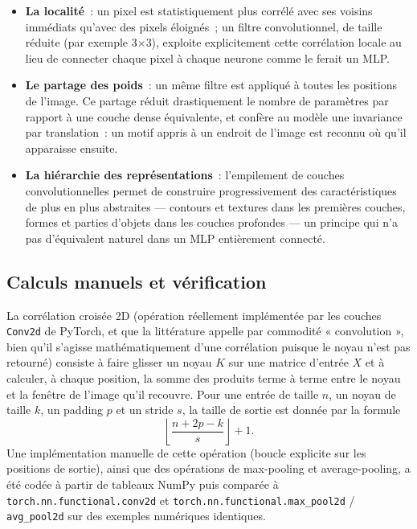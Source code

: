 \documentclass[11pt,a4paper]{article}
\begin{document}
\begin{itemize}[leftmargin=1.2cm]
\item \textbf{La localité}~: un pixel est statistiquement plus corrélé avec ses voisins immédiats qu'avec des pixels éloignés~; un filtre convolutionnel, de taille réduite (par exemple 3$\times$3), exploite explicitement cette corrélation locale au lieu de connecter chaque pixel à chaque neurone comme le ferait un MLP.
\item \textbf{Le partage des poids}~: un même filtre est appliqué à toutes les positions de l'image. Ce partage réduit drastiquement le nombre de paramètres par rapport à une couche dense équivalente, et confère au modèle une invariance par translation~: un motif appris à un endroit de l'image est reconnu où qu'il apparaisse ensuite.
\item \textbf{La hiérarchie des représentations}~: l'empilement de couches convolutionnelles permet de construire progressivement des caractéristiques de plus en plus abstraites --- contours et textures dans les premières couches, formes et parties d'objets dans les couches profondes --- un principe qui n'a pas d'équivalent naturel dans un MLP entièrement connecté.
\end{itemize}

\subsection{Calculs manuels et vérification}

La corrélation croisée 2D (opération réellement implémentée par les couches \texttt{Conv2d} de PyTorch, et que la littérature appelle par commodité « convolution », bien qu'il s'agisse mathématiquement d'une corrélation puisque le noyau n'est pas retourné) consiste à faire glisser un noyau $K$ sur une matrice d'entrée $X$ et à calculer, à chaque position, la somme des produits terme à terme entre le noyau et la fenêtre de l'image qu'il recouvre. Pour une entrée de taille $n$, un noyau de taille $k$, un padding $p$ et un stride $s$, la taille de sortie est donnée par la formule
\[
\left\lfloor \frac{n + 2p - k}{s} \right\rfloor + 1.
\]
Une implémentation manuelle de cette opération (boucle explicite sur les positions de sortie), ainsi que des opérations de max-pooling et average-pooling, a été codée à partir de tableaux NumPy puis comparée à \texttt{torch.nn.functional.conv2d} et \texttt{torch.nn.functional.max\_pool2d} / \texttt{avg\_pool2d} sur des exemples numériques identiques.
\end{document}
